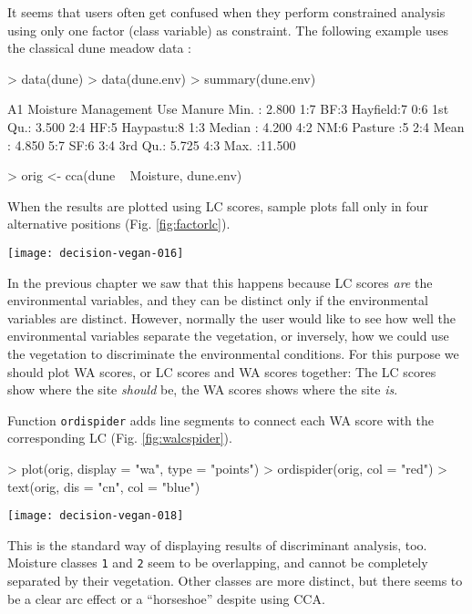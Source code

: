 \documentclass[a4paper,10pt]{amsart}
\begin{document}
It seems that users often get confused when they perform constrained
analysis using  only one factor (class variable) as constraint.  The
following example uses the classical dune meadow data \cite{Jongman87}:
\begin{Schunk}
\begin{Sinput}
> data(dune)
> data(dune.env)
> summary(dune.env)
\end{Sinput}
\begin{Soutput}
       A1         Moisture Management       Use    Manure
 Min.   : 2.800   1:7      BF:3       Hayfield:7   0:6   
 1st Qu.: 3.500   2:4      HF:5       Haypastu:8   1:3   
 Median : 4.200   4:2      NM:6       Pasture :5   2:4   
 Mean   : 4.850   5:7      SF:6                    3:4   
 3rd Qu.: 5.725                                    4:3   
 Max.   :11.500                                          
\end{Soutput}
\begin{Sinput}
> orig <- cca(dune ~ Moisture, dune.env)
\end{Sinput}
\end{Schunk}
When the results are plotted using LC scores, sample plots fall only
in four alternative positions (Fig. \ref{fig:factorlc}).
\begin{SCfigure}
\texttt{[image: decision-vegan-016]}
\caption{LC scores of the dune meadow data using only one factor as a
  constraint.}
\label{fig:factorlc}
\end{SCfigure}
In the previous chapter we saw that this happens because LC scores
\emph{are} the environmental variables, and they can be distinct only
if the environmental variables are distinct.  However, normally the user
would like to see how well the environmental variables separate the
vegetation, or inversely, how we could use the vegetation to
discriminate the environmental conditions.  For this purpose we should
plot WA scores, or LC scores and WA scores together:  The LC scores
show where the site \emph{should} be, the WA scores shows where the
site \emph{is}.

Function \texttt{ordispider} adds line segments to connect each WA
score with the corresponding LC (Fig.  \ref{fig:walcspider}).
\begin{Schunk}
\begin{Sinput}
> plot(orig, display = "wa", type = "points")
> ordispider(orig, col = "red")
> text(orig, dis = "cn", col = "blue")
\end{Sinput}
\end{Schunk}
\begin{SCfigure}
\texttt{[image: decision-vegan-018]}
\caption{A ``spider plot'' connecting WA scores to corresponding LC
  scores. The shorter the web segments, the better the ordination.}
\label{fig:walcspider}
\end{SCfigure}
This is the standard way of displaying results of discriminant
analysis, too.  Moisture classes \texttt{1} and \texttt{2} seem to be
overlapping, and cannot be completely separated by their
vegetation. Other classes are more distinct, but there seems to be a
clear arc effect or a ``horseshoe'' despite using CCA.
\end{document}
